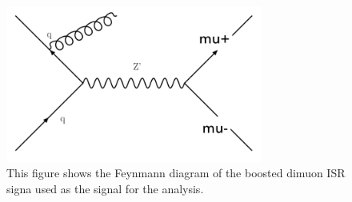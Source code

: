 \begin{figure}[!htb]
    \begin{center}
        \includegraphics[width=0.75\textwidth]{figures/chapter_dimuon/dimuonISRFeynmann}
        \caption{
        This figure shows the Feynmann diagram of the boosted dimuon ISR signa used as the signal for the analysis. }
            \label{fig:dimuonISRFeynmann}
    \end{center}
\end{figure}






